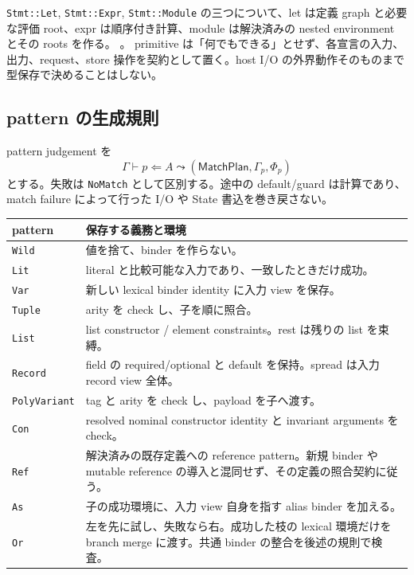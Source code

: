 \documentclass[11pt,a4paper]{article}
\theoremstyle{remark}
\newcommand{\src}[2]{\href{https://github.com/momota1029/yulang/blob/a58eefc31e22141574b6f20c6a5748151c6d79f1/#1}{\detokenize{#2}}}
\begin{document}
\texttt{Stmt::Let}, \texttt{Stmt::Expr}, \texttt{Stmt::Module} の三つについて、let は定義 graph と必要な評価 root、expr は順序付き計算、module は解決済みの nested environment とその roots を作る。
\src{crates/poly/src/expr.rs\#L169-L180}{statement constructors}。
primitive は「何でもできる」とせず、各宣言の入力、出力、request、store 操作を契約として置く。host I/O の外界動作そのものまで型保存で決めることはしない。

\subsection{pattern の生成規則}

pattern judgement を
\[
\Gamma\vdash p\Leftarrow A\leadsto
 (\mathsf{MatchPlan},\Gamma_p,\Phi_p)
\]
とする。失敗は \texttt{NoMatch} として区別する。途中の default/guard は計算であり、match failure によって行った I/O や State 書込を巻き戻さない。

\begin{longtable}{p{}p{}}
\toprule
pattern & 保存する義務と環境 \\
\midrule\endhead
\texttt{Wild} & 値を捨て、binder を作らない。\\
\texttt{Lit} & literal と比較可能な入力であり、一致したときだけ成功。\\
\texttt{Var} & 新しい lexical binder identity に入力 view を保存。\\
\texttt{Tuple} & arity を check し、子を順に照合。\\
\texttt{List} & list constructor / element constraints。rest は残りの list を束縛。\\
\texttt{Record} & field の required/optional と default を保持。spread は入力 record view 全体。\\
\texttt{PolyVariant} & tag と arity を check し、payload を子へ渡す。\\
\texttt{Con} & resolved nominal constructor identity と invariant arguments を check。\\
\texttt{Ref} & 解決済みの既存定義への reference pattern。新規 binder や mutable reference の導入と混同せず、その定義の照合契約に従う。\\
\texttt{As} & 子の成功環境に、入力 view 自身を指す alias binder を加える。\\
\texttt{Or} & 左を先に試し、失敗なら右。成功した枝の lexical 環境だけを branch merge に渡す。共通 binder の整合を後述の規則で検査。\\
\bottomrule
\end{longtable}
\end{document}
